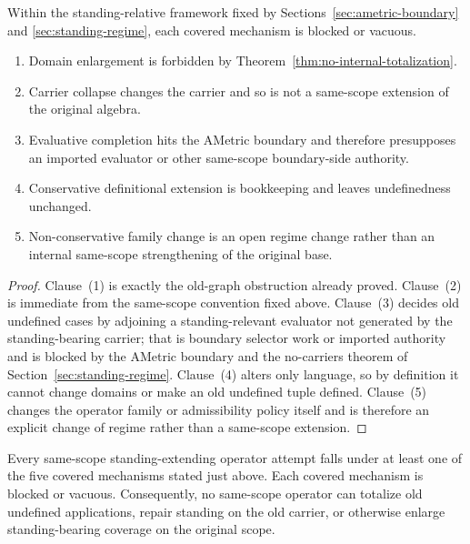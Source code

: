 \begin{proposition}
\label{prop:disposition-covered-mechanisms}
Within the standing-relative framework fixed by Sections~\ref{sec:ametric-boundary} and \ref{sec:standing-regime}, each covered mechanism is blocked or vacuous.
\begin{enumerate}
  \item Domain enlargement is forbidden by Theorem~\ref{thm:no-internal-totalization}.
  \item Carrier collapse changes the carrier and so is not a same-scope extension of the original algebra.
  \item Evaluative completion hits the AMetric boundary and therefore presupposes an imported evaluator or other same-scope boundary-side authority.
  \item Conservative definitional extension is bookkeeping and leaves undefinedness unchanged.
  \item Non-conservative family change is an open regime change rather than an internal same-scope strengthening of the original base.
\end{enumerate}
\end{proposition}

\begin{proof}
Clause~(1) is exactly the old-graph obstruction already proved. Clause~(2) is immediate from the same-scope convention fixed above. Clause~(3) decides old undefined cases by adjoining a standing-relevant evaluator not generated by the standing-bearing carrier; that is boundary selector work or imported authority and is blocked by the AMetric boundary and the no-carriers theorem of Section~\ref{sec:standing-regime}. Clause~(4) alters only language, so by definition it cannot change domains or make an old undefined tuple defined. Clause~(5) changes the operator family or admissibility policy itself and is therefore an explicit change of regime rather than a same-scope extension.
\end{proof}

\begin{theorem}
\label{thm:finite-exhaustion-schema}
Every same-scope standing-extending operator attempt falls under at least one of the five covered mechanisms stated just above. Each covered mechanism is blocked or vacuous. Consequently, no same-scope operator can totalize old undefined applications, repair standing on the old carrier, or otherwise enlarge standing-bearing coverage on the original scope.
\end{theorem}

